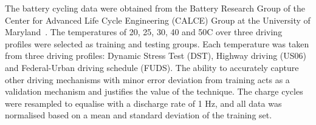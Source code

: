 %
%
{The battery cycling data were obtained from the Battery Research Group of the Center for Advanced Life Cycle Engineering (CALCE) Group at the University of Maryland~\cite{noauthor_calce_2017}.}
The temperatures of 20, 25, 30, 40 and 50\textdegree{}C over three driving profiles were selected as training and testing groups.
Each temperature was taken from three driving profiles: Dynamic Stress Test (DST), Highway driving (US06) and Federal-Urban driving schedule (FUDS).
The ability to accurately capture other driving mechanisms with minor error deviation from training acts as a validation mechanism and justifies the value of the technique.
The charge cycles were resampled to equalise with a discharge rate of 1 Hz, and all data was normalised based on a mean and standard deviation of the training set.

